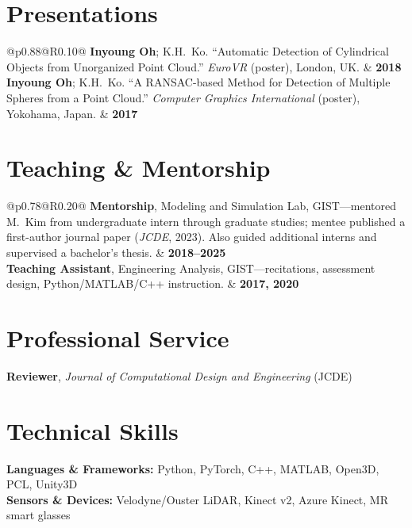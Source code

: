 \documentclass[10pt,a4paper]{article}
\begin{document}
	\section*{Presentations}
	\noindent
	\begin{tabular*}{\textwidth}{@{}p{}@{\extracolsep{\fill}}R{0.10\textwidth}@{}}
		\textbf{Inyoung Oh}; K.H.\ Ko. ``Automatic Detection of Cylindrical Objects from Unorganized Point Cloud.'' \textit{EuroVR} (poster), London, UK. & \textbf{2018} \\[1mm]
		\textbf{Inyoung Oh}; K.H.\ Ko. ``A RANSAC-based Method for Detection of Multiple Spheres from a Point Cloud.'' \textit{Computer Graphics International} (poster), Yokohama, Japan. & \textbf{2017} \\
	\end{tabular*}
	
	\section*{Teaching \& Mentorship}
	\noindent
	\begin{tabular*}{\textwidth}{@{}p{}@{\extracolsep{\fill}}R{0.20\textwidth}@{}}
		\textbf{Mentorship}, Modeling and Simulation Lab, GIST---mentored M.\ Kim from undergraduate intern through graduate studies; mentee published a first-author journal paper (\textit{JCDE}, 2023). Also guided additional interns and supervised a bachelor's thesis. & \textbf{2018--2025} \\[0.5mm]
		\textbf{Teaching Assistant}, Engineering Analysis, GIST---recitations, assessment design, Python/MATLAB/C++ instruction. & \textbf{2017, 2020} \\
	\end{tabular*}
	
	\section*{Professional Service}
	\noindent
	\textbf{Reviewer}, \textit{Journal of Computational Design and Engineering} (JCDE)
	
	\section*{Technical Skills}
	\noindent
	\textbf{Languages \& Frameworks:} Python, PyTorch, C++, MATLAB, Open3D, PCL, Unity3D \\
	\textbf{Sensors \& Devices:} Velodyne/Ouster LiDAR, Kinect v2, Azure Kinect, MR smart glasses%
	
\end{document}
